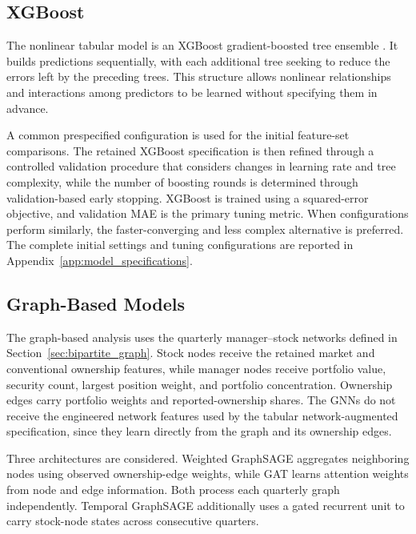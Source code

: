 \subsection{XGBoost}
\label{sec:nonlinear_models}

The nonlinear tabular model is an XGBoost gradient-boosted tree ensemble \parencite{chen2016xgboost}. It builds predictions sequentially, with each additional tree seeking to reduce the errors left by the preceding trees. This structure allows nonlinear relationships and interactions among predictors to be learned without specifying them in advance.

A common prespecified configuration is used for the initial feature-set comparisons. The retained XGBoost specification is then refined through a controlled validation procedure that considers changes in learning rate and tree complexity, while the number of boosting rounds is determined through validation-based early stopping. XGBoost is trained using a squared-error objective, and validation MAE is the primary tuning metric. When configurations perform similarly, the faster-converging and less complex alternative is preferred. The complete initial settings and tuning configurations are reported in Appendix~\ref{app:model_specifications}.

\subsection{Graph-Based Models}
\label{sec:graph_models}

The graph-based analysis uses the quarterly manager--stock networks defined in Section~\ref{sec:bipartite_graph}. Stock nodes receive the retained market and conventional ownership features, while manager nodes receive portfolio value, security count, largest position weight, and portfolio concentration. Ownership edges carry portfolio weights and reported-ownership shares. The GNNs do not receive the engineered network features used by the tabular network-augmented specification, since they learn directly from the graph and its ownership edges.

Three architectures are considered. Weighted GraphSAGE \parencite{hamilton2017inductive} aggregates neighboring nodes using observed ownership-edge weights, while GAT \parencite{velickovic2018graph} learns attention weights from node and edge information. Both process each quarterly graph independently. Temporal GraphSAGE additionally uses a gated recurrent unit to carry stock-node states across consecutive quarters.

